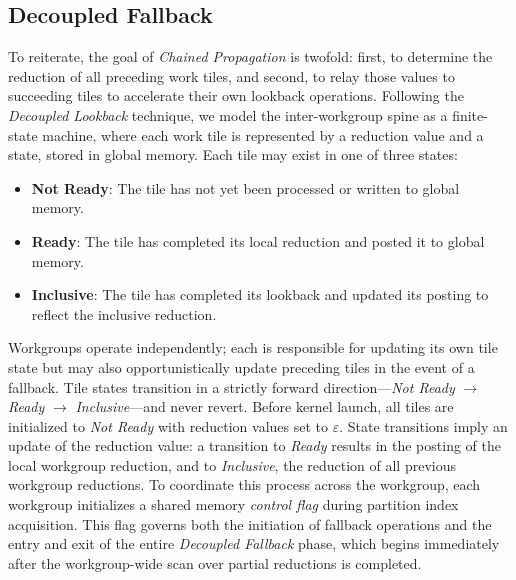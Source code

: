 \documentclass[acmsmall, manuscript, screen, review, anonymous]{acmart}
\begin{document}
\subsection{Decoupled Fallback}
To reiterate, the goal of \emph{Chained Propagation} is twofold: first, to determine the reduction of all preceding work tiles, and second, to relay those values to succeeding tiles to accelerate their own lookback operations. Following the \emph{Decoupled Lookback} technique, we model the inter-workgroup spine as a finite-state machine, where each work tile is represented by a reduction value and a state, stored in global memory. Each tile may exist in one of three states:
\begin{itemize}
  \item \textbf{Not Ready}: The tile has not yet been processed or written to global memory.
  \item \textbf{Ready}: The tile has completed its local reduction and posted it to global memory.
  \item \textbf{Inclusive}: The tile has completed its lookback and updated its posting to reflect the inclusive reduction.
\end{itemize}
Workgroups operate independently; each is responsible for updating its own tile state but may also opportunistically update preceding tiles in the event of a fallback. Tile states transition in a strictly forward direction---\emph{Not Ready} $\rightarrow$ \emph{Ready} $\rightarrow$ \emph{Inclusive}---and never revert. Before kernel launch, all tiles are initialized to \emph{Not Ready} with reduction values set to $\varepsilon$. State transitions imply an update of the reduction value: a transition to \emph{Ready} results in the posting of the local workgroup reduction, and to \emph{Inclusive}, the reduction of all previous workgroup reductions. To coordinate this process across the workgroup, each workgroup initializes a shared memory \emph{control flag} during partition index acquisition. This flag governs both the initiation of fallback operations and the entry and exit of the entire \emph{Decoupled Fallback} phase, which begins immediately after the workgroup-wide scan over partial reductions is completed.
\end{document}
